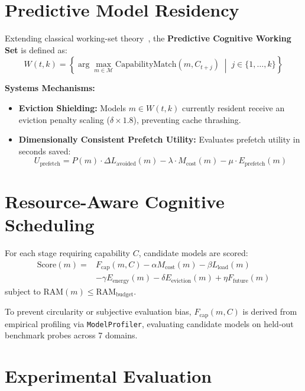 \documentclass[10pt,twocolumn]{article}
\begin{document}
\section{Predictive Model Residency}

Extending classical working-set theory~\cite{denning1968working}, the \textbf{Predictive Cognitive Working Set} is defined as:
\begin{equation}
W(t, k) = \left\{ \arg\max_{m \in \mathcal{M}} \text{CapabilityMatch}(m, C_{t+j}) \;\middle|\; j \in \{1, \dots, k\} \right\}
\end{equation}

\noindent\textbf{Systems Mechanisms:}
\begin{itemize}
    \item \textbf{Eviction Shielding:} Models $m \in W(t, k)$ currently resident receive an eviction penalty scaling ($\delta \times 1.8$), preventing cache thrashing.
    \item \textbf{Dimensionally Consistent Prefetch Utility:} Evaluates prefetch utility in seconds saved:
    \begin{equation}
    U_{\text{prefetch}} = P(m) \cdot \Delta L_{\text{avoided}}(m) - \lambda \cdot M_{\text{cost}}(m) - \mu \cdot E_{\text{prefetch}}(m)
    \end{equation}
\end{itemize}

\section{Resource-Aware Cognitive Scheduling}

For each stage requiring capability $C$, candidate models are scored:
\begin{equation}
\begin{aligned}
\text{Score}(m) = & F_{\text{cap}}(m, C) - \alpha M_{\text{cost}}(m) - \beta L_{\text{load}}(m) \\
                  & - \gamma E_{\text{energy}}(m) - \delta E_{\text{eviction}}(m) + \eta F_{\text{future}}(m)
\end{aligned}
\end{equation}
subject to $\text{RAM}(m) \le \text{RAM}_{\text{budget}}$.

To prevent circularity or subjective evaluation bias, $F_{\text{cap}}(m, C)$ is derived from empirical profiling via \texttt{ModelProfiler}, evaluating candidate models on held-out benchmark probes across 7 domains.

\section{Experimental Evaluation}
\end{document}
